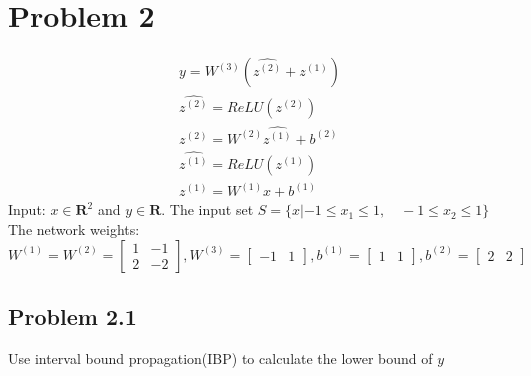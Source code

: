 \documentclass{article}
\begin{document}
\section{Problem 2}
\begin{align}
y = W^{(3)}(\hat{z^{(2)}}+z^{(1)})\\
\hat{z^{(2)}} = ReLU(z^{(2)})\\
z^{(2)} = W^{(2)}\hat{z^{(1)}}+b^{(2)}\\
\hat{z^{(1)}} = ReLU(z^{(1)})\\
z^{(1)} = W^{(1)}x+b^{(1)}
\end{align}
Input: $x \in \mathbf{R}^2$ and $y \in \mathbf{R}$. The input set $S = \{x|-1 \leq x_1 \leq 1, \quad -1 \leq x_2 \leq 1\}$\\
The network weights:
$$
    W^{(1)}=W^{(2)}=\begin{bmatrix}1 & -1 \\ 2 & -2\end{bmatrix}, W^{(3)}=\begin{bmatrix}-1 & 1 \end{bmatrix}, b^{(1)}=\begin{bmatrix}1 & 1 \end{bmatrix},
    b^{(2)}=\begin{bmatrix}2 & 2 \end{bmatrix}
$$
\subsection{Problem 2.1}
Use interval bound propagation(IBP) to calculate the lower bound of $y$
\end{document}
